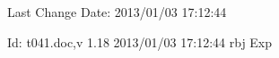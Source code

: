 \hypersetup{pdfkeywords=RogerBishopJones}

Last Change $ $Date: 2013/01/03 17:12:44 $ $

$ $Id: t041.doc,v 1.18 2013/01/03 17:12:44 rbj Exp $ $
